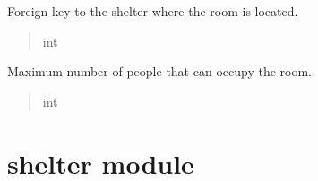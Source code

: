 \documentclass[letterpaper,10pt,english]{sphinxmanual}
\begin{document}
\begin{fulllineitems}

\begin{fulllineitems}
\label{\detokenize{app.models:app.models.room.Room.idShelter}}
\pysigstartsignatures
\pysigline
{}
\pysigstopsignatures
\sphinxAtStartPar
Foreign key to the shelter where the room is located.
\begin{quote}\begin{description}
\sphinxAtStartPar
int

\end{description}\end{quote}

\end{fulllineitems}


\begin{fulllineitems}
\label{\detokenize{app.models:app.models.room.Room.maxPeople}}
\pysigstartsignatures
\pysigline
{}
\pysigstopsignatures
\sphinxAtStartPar
Maximum number of people that can occupy the room.
\begin{quote}\begin{description}
\sphinxAtStartPar
int

\end{description}\end{quote}

\end{fulllineitems}


\end{fulllineitems}



\section{shelter module}
\label{\detokenize{app.models:module-app.models.shelter}}\label{\detokenize{app.models:shelter-module}}
\end{document}
